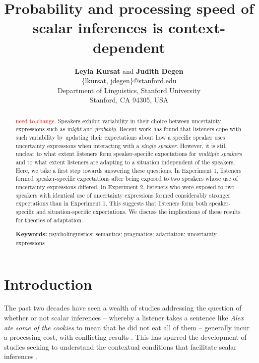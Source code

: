 \documentclass[10pt,letterpaper]{article}
\title{Probability and processing speed of scalar inferences is context-dependent}
\author{{\large \textbf{Leyla Kursat}  {\normalfont and} \textbf{Judith Degen}}  \\
 \{lkursat, jdegen\}@stanford.edu \\
  Department of Linguistics, Stanford University \\
  Stanford, CA 94305, USA}
\begin{document}
\maketitle


\begin{abstract}

\textcolor{red}{need to change}. Speakers exhibit variability in their choice between uncertainty expressions such as \emph{might} and \emph{probably}. Recent work has found that listeners cope with such variability by updating their expectations about how a specific speaker uses uncertainty expressions when interacting with a \emph{single speaker}. However, it is still unclear to what extent listeners form speaker-specific expectations for \emph{multiple speakers} and to what extent listeners are adapting to a situation independent of the speakers. Here, we take a first step towards answering these questions. In Experiment 1, listeners formed speaker-specific expectations after being exposed to two speakers whose use of uncertainty expressions differed. In Experiment 2, listeners who were exposed to two speakers with identical use of uncertainty expressions formed considerably stronger expectations than in Experiment 1. This suggests that listeners form both speaker-specific and situation-specific expectations. We discuss the implications of these results for theories of adaptation.

\textbf{Keywords:} psycholinguistics; semantics; pragmatics; adaptation; uncertainty expressions

\end{abstract}

\section{Introduction}

The past two decades have seen a wealth of studies addressing the question of whether or not scalar inferences -- whereby a listener takes a sentence like \textit{Alex ate some of the cookies} to mean that he did not eat all of them -- generally incur a processing cost, with conflicting results \cite{BottNoveck2004,HuangSnedeker2009,Grodner2010,Breheny2013,DegenTanenhaus2016}. This has spurred the development of studies seeking to understand the contextual conditions that facilitate scalar inferences \cite{Zondervan2010,Degen2015,Augurzky2019,MartyChemla2013,DegenGoodman2014}.
\end{document}
